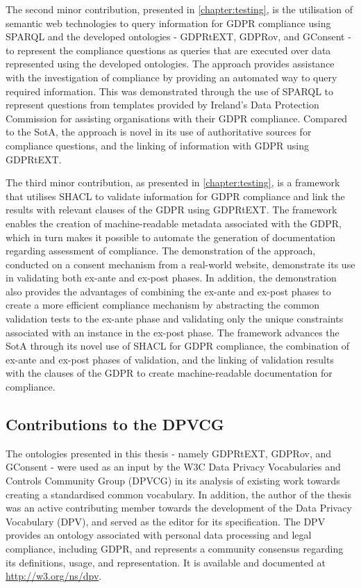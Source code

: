 The second minor contribution, presented in \autoref{chapter:testing}, is the utilisation of semantic web technologies to query information for GDPR compliance using SPARQL and the developed ontologies - GDPRtEXT, GDPRov, and GConsent - to represent the compliance questions as queries that are executed over data represented using the developed ontologies.
The approach provides assistance with the investigation of compliance by providing an automated way to query required information. This was demonstrated through the use of SPARQL to represent questions from templates provided by Ireland's Data Protection Commission for assisting organisations with their GDPR compliance.
Compared to the SotA, the approach is novel in its use of authoritative sources for  compliance questions, and the linking of information with GDPR using GDPRtEXT.

The third minor contribution, as presented in \autoref{chapter:testing}, is a framework that utilises SHACL to validate information for GDPR compliance and link the results with relevant clauses of the GDPR using GDPRtEXT. 
The framework enables the creation of machine-readable metadata associated with the GDPR, which in turn makes it possible to automate the generation of documentation regarding assessment of compliance.
The demonstration of the approach, conducted on a consent mechanism from a real-world website, demonstrate its use in validating both ex-ante and ex-post phases.
In addition, the demonstration also provides the advantages of combining the ex-ante and ex-post phases to create a more efficient compliance mechanism by abstracting the common validation tests to the ex-ante phase and validating only the unique constraints associated with an instance in the ex-post phase.
The framework advances the SotA through its novel use of SHACL for GDPR compliance, the combination of ex-ante and ex-post phases of validation, and the linking of validation results with the clauses of the GDPR to create machine-readable documentation for compliance.

\subsection*{Contributions to the DPVCG}
The ontologies presented in this thesis - namely GDPRtEXT, GDPRov, and GConsent - were used as an input by the W3C Data Privacy Vocabularies and Controls Community Group (DPVCG) in its analysis of existing work towards creating a standardised common vocabulary.
In addition, the author of the thesis was an active contributing member towards the development of the Data Privacy Vocabulary (DPV), and served as the editor for its specification.
The DPV provides an ontology associated with personal data processing and legal compliance, including GDPR, and represents a community consensus regarding its definitions, usage, and representation.
It is available and documented at \url{http://w3.org/ns/dpv}.

